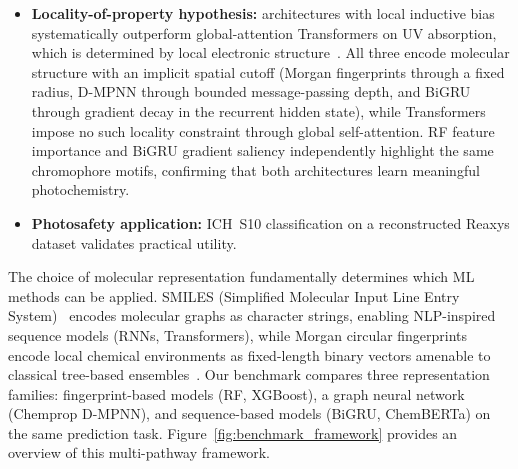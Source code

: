 \documentclass[journal=jcisd8,manuscript=article]{achemso}
\begin{document}
\begin{itemize}
 \item \textbf{Locality-of-property hypothesis:} architectures with local inductive bias systematically outperform global-attention Transformers on UV absorption, which is determined by local electronic structure~\cite{chenMolecularLanguage2023}. All three encode molecular structure with an implicit spatial cutoff (Morgan fingerprints through a fixed radius, D-MPNN through bounded message-passing depth, and BiGRU through gradient decay in the recurrent hidden state), while Transformers impose no such locality constraint through global self-attention. RF feature importance and BiGRU gradient saliency independently highlight the same chromophore motifs, confirming that both architectures learn meaningful photochemistry.
 \item \textbf{Photosafety application:} ICH~S10 classification on a reconstructed Reaxys dataset validates practical utility.
\end{itemize}

The choice of molecular representation fundamentally determines which ML methods can be applied.
SMILES (Simplified Molecular Input Line Entry System)~\cite{weininger1988smiles} encodes molecular graphs as character strings, enabling NLP-inspired sequence models (RNNs, Transformers), while Morgan circular fingerprints~\cite{rogers2010extended} encode local chemical environments as fixed-length binary vectors amenable to classical tree-based ensembles~\cite{landrum2016rdkit, wuMoleculeNet2018}.
Our benchmark compares three representation families: fingerprint-based models (RF, XGBoost), a graph neural network (Chemprop D-MPNN), and sequence-based models (BiGRU, ChemBERTa) on the same prediction task.
Figure~\ref{fig:benchmark_framework} provides an overview of this multi-pathway framework.
\end{document}

